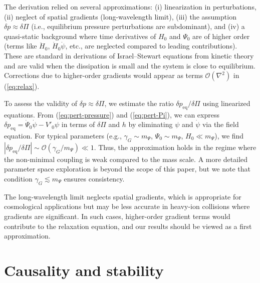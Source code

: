 \documentclass[aps,prd,reprint,superscriptaddress,floatfix]{revtex4-2}
\begin{document}
The derivation relied on several approximations: (i) linearization in perturbations, (ii) neglect of spatial gradients (long-wavelength limit), (iii) the assumption $\delta p \approx \delta\Pi$ (i.e., equilibrium pressure perturbations are subdominant), and (iv) a quasi-static background where time derivatives of $H_0$ and $\Psi_0$ are of higher order (terms like $\ddot H_0$, $\dot H_0 \dot\psi$, etc., are neglected compared to leading contributions). These are standard in derivations of Israel--Stewart equations from kinetic theory \cite{Maartens} and are valid when the dissipation is small and the system is close to equilibrium. Corrections due to higher-order gradients would appear as terms $\mathcal{O}(\nabla^2)$ in (\ref{eq:relax}).

To assess the validity of $\delta p \approx \delta\Pi$, we estimate the ratio $\delta p_{\mathrm{eq}}/\delta\Pi$ using linearized equations. From (\ref{eq:pert-pressure}) and (\ref{eq:pert-Pi}), we can express $\delta p_{\mathrm{eq}} = \dot\Psi_0 \dot\psi - V'_0\psi$ in terms of $\delta\Pi$ and $h$ by eliminating $\psi$ and $\dot\psi$ via the field equation. For typical parameters (e.g., $\gamma_G \sim m_\Psi$, $\Psi_0 \sim m_\Psi$, $H_0 \ll m_\Psi$), we find $|\delta p_{\mathrm{eq}}/\delta\Pi| \sim \mathcal{O}(\gamma_G/m_\Psi) \ll 1$. Thus, the approximation holds in the regime where the non-minimal coupling is weak compared to the mass scale. A more detailed parameter space exploration is beyond the scope of this paper, but we note that condition $\gamma_G \lesssim m_\Psi$ ensures consistency.

The long-wavelength limit neglects spatial gradients, which is appropriate for cosmological applications but may be less accurate in heavy-ion collisions where gradients are significant. In such cases, higher-order gradient terms would contribute to the relaxation equation, and our results should be viewed as a first approximation.

\section{Causality and stability}
\label{sec:causality}
\end{document}
